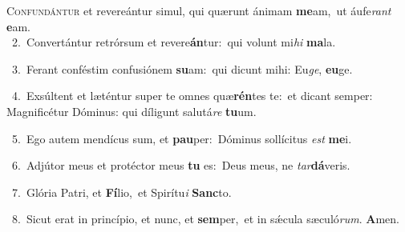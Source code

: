 \lettrine{\initial\textcolor{\initialcolor}{C}}{onfundántur} et revereántur simul, qui quærunt ánimam \textbf{me}\-am,~\star ut áufe\textit{rant} \textbf{e}\-am.\\
{\numbfont\textcolor{\numbcolor}{~2.}}~Convertántur retrórsum et revere\-\textbf{án}\-tur:~\star qui volunt mi\textit{hi} \textbf{ma}\-la.\par
{\numbfont\textcolor{\numbcolor}{~3.}}~Ferant conféstim confusiónem \textbf{su}\-am:~\star qui dicunt mihi: Eu\-\textit{ge}\-, \textbf{eu}\-ge.\par
{\numbfont\textcolor{\numbcolor}{~4.}}~Exsúltent et læténtur super te omnes quæ\-\textbf{rén}\-tes te:~\star et dicant semper: Magnificétur Dóminus: qui díligunt salutá\textit{re} \textbf{tu}\-um.\par
{\numbfont\textcolor{\numbcolor}{~5.}}~Ego autem mendícus sum, et \textbf{pau}\-per:~\star Dóminus sollícitus \textit{est} \textbf{me}\-i.\par
{\numbfont\textcolor{\numbcolor}{~6.}}~Adjútor meus et protéctor meus \textbf{tu} es:~\star Deus meus, ne \textit{tar}\-\textbf{dá}veris.\par
{\numbfont\textcolor{\numbcolor}{~7.}}~Glória Patri, et \textbf{Fí}\-lio,~\star et Spirítu\textit{i} \textbf{Sanc}\-to.\par
{\numbfont\textcolor{\numbcolor}{~8.}}~Sicut erat in princípio, et nunc, et \textbf{sem}\-per,~\star et in sǽcula sæculó\-\textit{rum}\-. \textbf{A}\-men.\par
